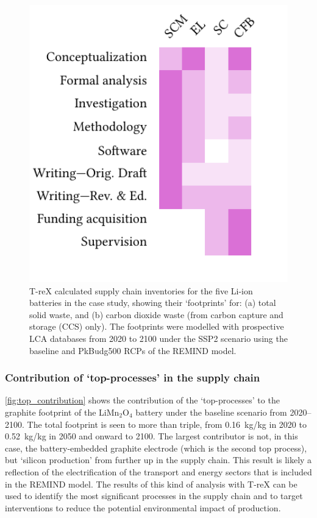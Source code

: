 \begin{figure}[H]
    \centering
    \includegraphics[width=16cm]{figures/T-reX-wastefootprint-totalANDcarbon.pdf}
    \caption{T-reX calculated supply chain inventories for the five Li-ion batteries in the case study, showing their `footprints' for: (a) total solid waste, and (b) carbon dioxide waste (from carbon capture and storage (CCS) only). The footprints were modelled with prospective LCA databases from 2020 to 2100 under the SSP2 scenario using the baseline and PkBudg500 RCPs of the REMIND model.}\label{fig:waste_totalANDcarbon}
\end{figure}

\subsubsection{Contribution of `top-processes' in the supply chain}%

\autoref{fig:top_contribution} shows the contribution of the `top-processes' to the graphite footprint of the  LiMn\(_2\)O\(_4\) battery under the baseline scenario from 2020--2100. The total footprint is seen to more than triple, from 0.16~kg/kg in 2020 to 0.52~kg/kg in 2050 and onward to 2100. The largest contributor is not, in this case, the battery-embedded graphite electrode (which is the second top process), but `silicon production' from further up in the supply chain. This result is likely a reflection of the electrification of the transport and energy sectors that is included in the REMIND model. The results of this kind of analysis with T-reX can be used to identify the most significant processes in the supply chain and to target interventions to reduce the potential environmental impact of production.

